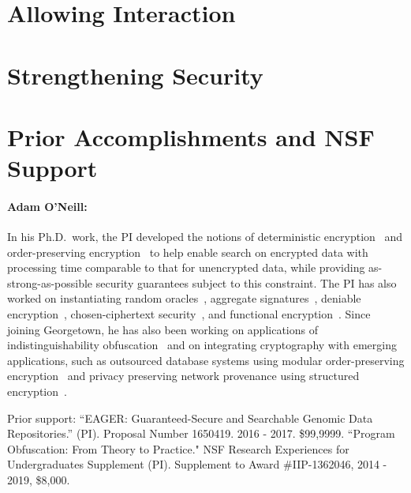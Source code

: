 \documentclass[11pt]{article}
\theoremstyle{remark}
\begin{document}
%

\section{Allowing Interaction}
\label{sec:interactive}




\section{Strengthening Security}
\label{sec:improving security}


\section{Prior Accomplishments and NSF Support}

\paragraph{Adam O'Neill:}
In his Ph.D.~work, the PI  developed the notions of deterministic encryption~\cite{C:BelBolONe07,Amanatidis2007,C:BolFehONe08,C:BFOR08,TCC:FulNeiRey12} and order-preserving encryption~\cite{EC:BCLO09,C:BolCheONe11} to help enable search on encrypted data with processing time comparable to that for unencrypted data, while providing as-strong-as-possible security guarantees subject to this constraint.
The PI has also worked on  instantiating random oracles~\cite{C:KilOneSmi10,TCC:GoyONeRao11,EC:LewONeSmi13},   aggregate signatures~\cite{CCS:BGOY07,AC:GLOW12}, deniable encryption~\cite{C:OnePeiWat11},  chosen-ciphertext security~\cite{EC:KilMohOne10,PKC:DFMO14}, and  functional encryption~\cite{EPRINT:ONeill10b,C:DIJOPP13, CANS:BelONe13}.   %
Since joining Georgetown, he has also been working on  applications of indistinguishability obfuscation~\cite{PKC:DGLOZ16} and on integrating cryptography with emerging applications, such as outsourced database systems using modular order-preserving encryption~\cite{mavroforakis2015modular} and  privacy preserving network provenance using structured encryption~\cite{zhang2017privacy}.


Prior support: ``EAGER: Guaranteed-Secure and Searchable Genomic Data Repositories.'' (PI). Proposal Number 1650419.  2016 - 2017. \$99,9999.
``Program Obfuscation: From Theory to Practice." NSF Research Experiences for Undergraduates Supplement (PI).
Supplement to Award \#IIP-1362046,   2014 - 2019, \$8,000.
\end{document}
